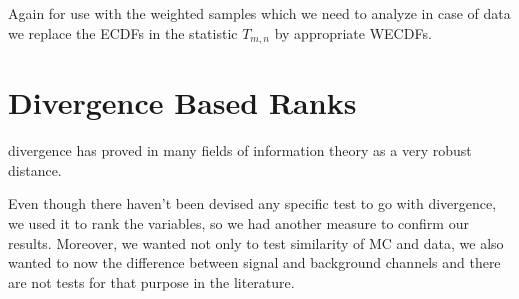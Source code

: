 Again for use with the weighted samples which we need to analyze in case of \dzero data we replace the ECDFs in the statistic $T_{m,n}$ by appropriate WECDFs.

\section{\ren Divergence Based Ranks}
\ren divergence has proved in many fields of information theory as a very robust distance. 

Even though there haven't been devised any specific test to go with \ren divergence, we used it to rank the variables, so we had another measure to confirm our results. Moreover, we wanted not only to test similarity of MC and data, we also wanted to now the difference between signal and background channels and there are not tests for that purpose in the literature.


